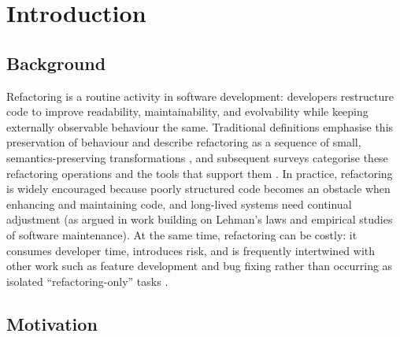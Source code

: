\chapter{Introduction}
\section{Background}


Refactoring is a routine activity in software development: developers restructure code to improve readability, maintainability, and evolvability while keeping externally observable behaviour the same. Traditional definitions emphasise this preservation of behaviour and describe refactoring as a sequence of small, semantics-preserving transformations \cite{opdyke1992refactoring,fowler1999refactoring,fowler2018refactoring}, and subsequent surveys categorise these refactoring operations and the tools that support them \cite{mens2004survey}. In practice, refactoring is widely encouraged because poorly structured code becomes an obstacle when enhancing and maintaining code, and long-lived systems need continual adjustment (as argued in work building on Lehman’s laws and empirical studies of software maintenance). At the same time, refactoring can be costly: it consumes developer time, introduces risk, and is frequently intertwined with other work such as feature development and bug fixing rather than occurring as isolated “refactoring-only” tasks \cite{murphyhill2009howrefactor,kim2011apilevel}.

\section{Motivation}

